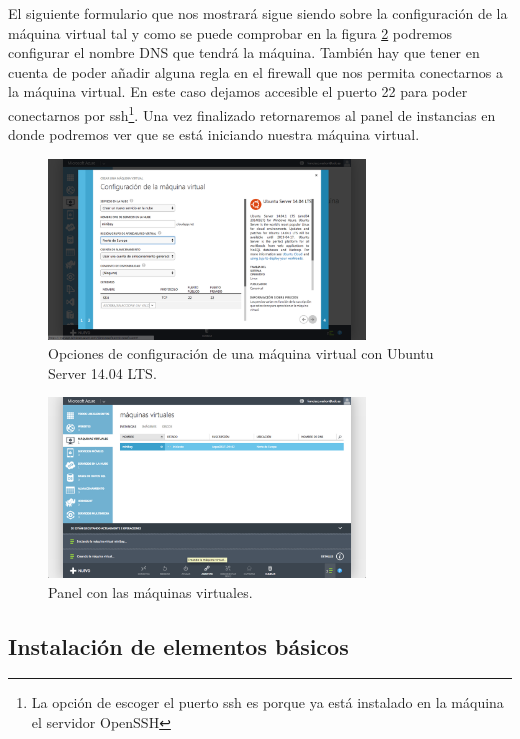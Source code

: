 \documentclass{article}
\begin{document}
	El siguiente formulario que nos mostrará sigue siendo sobre la configuración de la máquina virtual tal y como se puede comprobar en la figura \ref{fig:VirtualMachineConfigUbuntuServer2} podremos configurar el nombre DNS que tendrá la máquina. También hay que tener en cuenta de poder añadir alguna regla en el firewall que nos permita conectarnos a la máquina virtual. En este caso dejamos accesible el puerto 22 para poder conectarnos por ssh\footnote{La opción de escoger el puerto ssh es porque ya está instalado en la máquina el servidor OpenSSH}. Una vez finalizado retornaremos al panel de instancias en donde podremos ver que se está iniciando nuestra máquina virtual.

\begin{figure}[h]
  \centering
    \includegraphics[width=0.75\textwidth]{img/m_p004.png}
  \caption{Opciones de configuración de una máquina virtual con Ubuntu Server 14.04 LTS.}
  \label{fig:VirtualMachineConfigUbuntuServer2}
\end{figure}

\begin{figure}[h]
  \centering
    \includegraphics[width=0.75\textwidth]{img/m_p006.png}
  \caption{Panel con las máquinas virtuales.}
  \label{fig:VirtualMachineConfigUbuntuServer2}
\end{figure}
	
	
\subsection{Instalación de elementos básicos}
\end{document}

